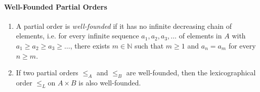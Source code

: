 \documentclass[10pt,twoside,twocolumn]{article}
\newcommand{\N}[0]{\mathds{N}} %
\begin{document}
\paragraph{Well-Founded Partial Orders}
\begin{enumerate}
\item A partial order is \emph{well-founded} if it has no infinite decreasing
chain of elements, i.e. for every infinite sequence $a_{1},a_{2},a_{3},\dots$
of elements in $A$ with $a_{1}\geq a_{2}\geq a_{3}\geq\dots$, there
exists $m\in\N$ such that $m\geq1$ and $a_{n}=a_{m}$ for every
$n\geq m$.
\item If two partial orders $\leq_{A}$ and $\leq_{B}$ are well-founded,
then the lexicographical order $\leq_{L}$on $A\times B$ is also
well-founded.\end{enumerate}
\end{document}
